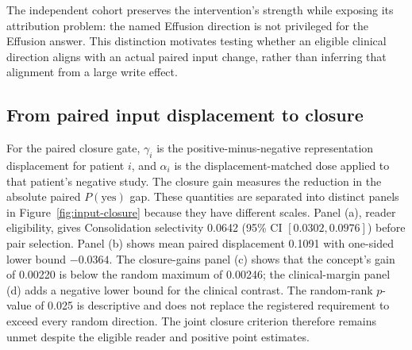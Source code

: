 \begin{table}[H]
\centering
\caption{Locked-dose Qwen Effusion specificity.}
\label{tab:specificity-controls}
\end{table}

The independent cohort preserves the intervention's strength while
exposing its attribution problem: the named Effusion direction is not
privileged for the Effusion answer. This distinction motivates testing
whether an eligible clinical direction aligns with an actual paired input
change, rather than inferring that alignment from a large write effect.

\subsection{From paired input displacement to closure}

For the paired closure gate, $\gamma_i$ is the positive-minus-negative
representation displacement for patient $i$, and $\alpha_i$ is the
displacement-matched dose applied to that patient's negative study.  The
closure gain measures the reduction in the absolute paired
$P(\mathrm{yes})$ gap.  These quantities are separated into distinct panels
in Figure~\ref{fig:input-closure} because they have different scales.
Panel (a), reader eligibility, gives Consolidation selectivity 0.0642
(95\% CI $[0.0302,0.0976]$) before pair selection. Panel (b) shows mean
paired displacement 0.1091 with one-sided lower bound $-0.0364$. The
closure-gains panel (c) shows that the concept's gain of 0.00220 is below the
random maximum of 0.00246; the clinical-margin panel (d) adds a negative lower
bound for the clinical contrast. The random-rank $p$-value of 0.025 is descriptive
and does not replace the registered requirement to exceed every random
direction. The joint closure criterion therefore remains unmet despite the
eligible reader and positive point estimates.

